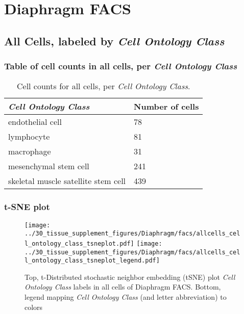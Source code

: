\clearpage
\section{Diaphragm FACS}

\subsection{All Cells, labeled by \emph{Cell Ontology Class}}
\subsubsection{Table of cell counts in all cells, per \emph{Cell Ontology Class}}\begin{table}[h]
\centering
\label{my-label}
\begin{tabular}{@{}ll@{}}
\toprule

\emph{Cell Ontology Class}& Number of cells \\ \midrule
endothelial cell & 78 \\

lymphocyte & 81 \\

macrophage & 31 \\

mesenchymal stem cell & 241 \\

skeletal muscle satellite stem cell & 439 \\
\bottomrule
\end{tabular}
\caption{Cell counts for all cells, per \emph{Cell Ontology Class}.}
\end{table}

\clearpage
\subsubsection{t-SNE plot}
\begin{figure}[h]
\centering
\texttt{[image: ../30\_tissue\_supplement\_figures/Diaphragm/facs/allcells\_cell\_ontology\_class\_tsneplot.pdf]}
\texttt{[image: ../30\_tissue\_supplement\_figures/Diaphragm/facs/allcells\_cell\_ontology\_class\_tsneplot\_legend.pdf]}
\caption{Top, t-Distributed stochastic neighbor embedding (tSNE) plot  \emph{Cell Ontology Class} labels in all cells of Diaphragm FACS. Bottom, legend mapping \emph{Cell Ontology Class} (and letter abbreviation) to colors}
\end{figure}


\clearpage


